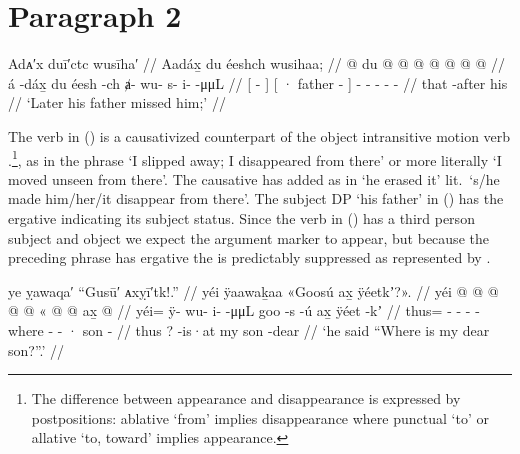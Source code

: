\section{Paragraph 2}\label{sec:100-para-2}

\ex\label{ex:100-18-father-missed-him}%
%
\begingl
	\glpreamble	Adᴀ′x duī′ctc wusīha′ //
	\glpreamble	Aadáx̱ du éeshch wusihaa; //
	\gla	{}  @ {} {} {} du  @ {} {}  @ {} @ {} @ {} @ {} @ {} @ {} //
	\glb	{} á -dáx̱ {} {} du éesh -ch {} ⱥ- wu- s- i-  -μμL //
	\glc	{}[  - {}] {}[ · father - {}]
			- - - -  - //
	\gld	{} that -after {} {} his  {} {}  {} {} {} {} {} {} //
	\glft	‘Later his father missed him;’
		//
\endgl
\xe

The verb  in (\lastx) is a causativized counterpart of the object intransitive motion verb .\footnote{The difference between appearance and disappearance is expressed by postpositions: ablative  ‘from’ implies disappearance where punctual  ‘to’ or allative  ‘to, toward’ implies appearance.}, as in the phrase  ‘I slipped away; I disappeared from there’ \parencite[01/5]{leer:1973} or more literally ‘I moved unseen from there’.
The causative has added  as in  ‘he erased it’ \parencite[01/6–7]{leer:1973} lit.\ ‘s/he made him/her/it disappear from there’.
The subject DP  ‘his father’ in (\lastx) has the ergative  indicating its subject status.
Since the verb in (\lastx) has a third person subject and object we expect the argument marker  to appear, but because the preceding phrase has ergative  the  is predictably suppressed as represented by .

\ex\label{ex:100-19-where's-my-son}%
%
\begingl
	\glpreamble	ye ỵawaqa′ “Gusū′ ᴀxỵī′tk!.” //
	\glpreamble	yéi ÿaawaḵaa «\!Goosú ax̱ ÿéetkʼ?\!». //
	\gla	yéi @  @ {} @ {} @ {} @ {}
		«\! @ {} @ {} ax̱  @ {} //
	\glb	 yéi= ÿ- wu- i-  -μμL
		\phantom{«\!}goo -s -ú ax̱ ÿéet -kʼ //
	\glc	thus= - - -  -
		\phantom{«\!}where - - · son - //
	\gld	thus  {} {} {} {}
		\phantom{«\!} \·? -is·at my son -dear //
	\glft	‘he said “Where is my dear son?”.’
		//
\endgl
\xe

